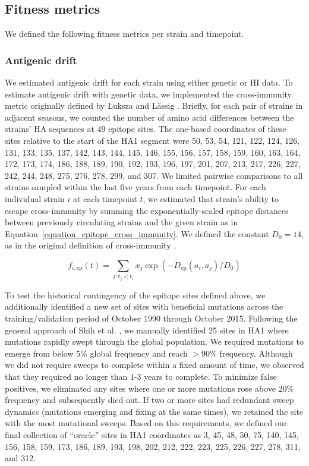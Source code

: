 \subsection*{Fitness metrics}

We defined the following fitness metrics per strain and timepoint.

\subsubsection*{Antigenic drift}

We estimated antigenic drift for each strain using either genetic or HI data.
To estimate antigenic drift with genetic data, we implemented the cross-immunity metric originally defined by {\L}uksza and L\"assig \cite{Luksza:2014hj}.
Briefly, for each pair of strains in adjacent seasons, we counted the number of amino acid differences between the strains' HA sequences at 49 epitope sites.
The one-based coordinates of these sites relative to the start of the HA1 segment were 50, 53, 54, 121, 122, 124, 126, 131, 133, 135, 137, 142, 143, 144, 145, 146, 155, 156, 157, 158, 159, 160, 163, 164, 172, 173, 174, 186, 188, 189, 190, 192, 193, 196, 197, 201, 207, 213, 217, 226, 227, 242, 244, 248, 275, 276, 278, 299, and 307.
We limited pairwise comparisons to all strains sampled within the last five years from each timepoint.
For each individual strain $i$ at each timepoint $t$, we estimated that strain's ability to escape cross-immunity by summing the exponentially-scaled epitope distances between previously circulating strains and the given strain as in Equation~\ref{equation_epitope_cross_immunity}.
We defined the constant $D_{0} = 14$, as in the original definition of cross-immunity \cite{Luksza:2014hj}.

\begin{equation}
    f_{i,\mathrm{ep}}(t) = \sum_{j: t_{j} < t_{i}}{x_{j}\exp{(-D_{\mathrm{ep}}(a_{i}, a_{j}) / D_{0})}}
    \label{equation_epitope_cross_immunity}
\end{equation}

To test the historical contingency of the epitope sites defined above, we additionally identified a new set of sites with beneficial mutations across the training/validation period of October 1990 through October 2015.
Following the general approach of Shih et al. \cite{Shih:2007bd}, we manually identified 25 sites in HA1 where mutations rapidly swept through the global population.
We required mutations to emerge from below 5\% global frequency and reach $>$90\% frequency.
Although we did not require sweeps to complete within a fixed amount of time, we observed that they required no longer than 1-3 years to complete.
To minimize false positives, we eliminated any sites where one or more mutations rose above 20\% frequency and subsequently died out.
If two or more sites had redundant sweep dynamics (mutations emerging and fixing at the same times), we retained the site with the most mutational sweeps.
Based on this requirements, we defined our final collection of ``oracle'' sites in HA1 coordinates as 3, 45, 48, 50, 75, 140, 145, 156, 158, 159, 173, 186, 189, 193, 198, 202, 212, 222, 223, 225, 226, 227, 278, 311, and 312.

